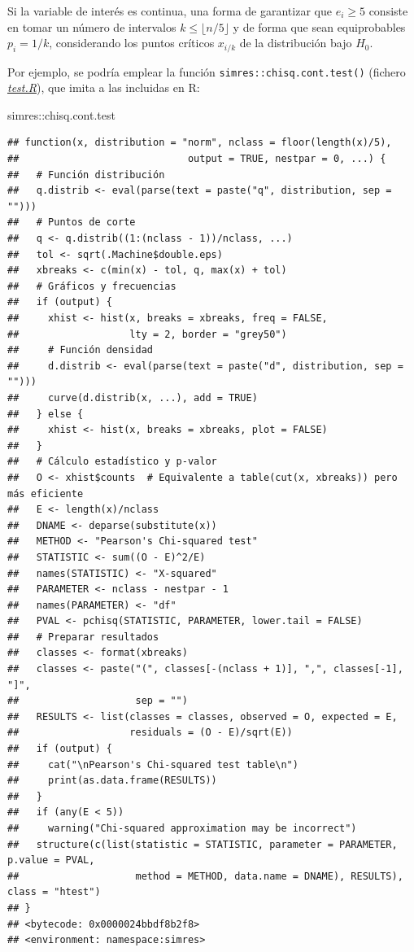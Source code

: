 \documentclass[
]{book}
\newenvironment{Shaded}{\begin{snugshade}}{\end{snugshade}}
\newcommand{\NormalTok}[1]{#1}
\newcommand{\SpecialCharTok}[1]{\textcolor[rgb]{0.00,0.00,0.00}{#1}}
\theoremstyle{break}
\theoremstyle{nonumberplain}
\begin{document}
Si la variable de interés es continua, una forma de garantizar que \(e_{i}\geq5\) consiste en tomar un número de intervalos \(k\leq \lfloor n/5 \rfloor\) y de forma que sean equiprobables \(p_{i}=1/k\),
considerando los puntos críticos \(x_{i/k}\) de la distribución bajo \(H_0\).

Por ejemplo, se podría emplear la función \texttt{simres::chisq.cont.test()} (fichero \href{R/test.R}{\emph{test.R}}), que imita a las incluidas en R:

\begin{Shaded}
\begin{Highlighting}[]
\NormalTok{simres}\SpecialCharTok{::}\NormalTok{chisq.cont.test}
\end{Highlighting}
\end{Shaded}

\begin{verbatim}
## function(x, distribution = "norm", nclass = floor(length(x)/5),
##                             output = TRUE, nestpar = 0, ...) {
##   # Función distribución
##   q.distrib <- eval(parse(text = paste("q", distribution, sep = "")))
##   # Puntos de corte
##   q <- q.distrib((1:(nclass - 1))/nclass, ...)
##   tol <- sqrt(.Machine$double.eps)
##   xbreaks <- c(min(x) - tol, q, max(x) + tol)
##   # Gráficos y frecuencias
##   if (output) {
##     xhist <- hist(x, breaks = xbreaks, freq = FALSE,
##                   lty = 2, border = "grey50")
##     # Función densidad
##     d.distrib <- eval(parse(text = paste("d", distribution, sep = "")))
##     curve(d.distrib(x, ...), add = TRUE)
##   } else {
##     xhist <- hist(x, breaks = xbreaks, plot = FALSE)
##   }
##   # Cálculo estadístico y p-valor
##   O <- xhist$counts  # Equivalente a table(cut(x, xbreaks)) pero más eficiente
##   E <- length(x)/nclass
##   DNAME <- deparse(substitute(x))
##   METHOD <- "Pearson's Chi-squared test"
##   STATISTIC <- sum((O - E)^2/E)
##   names(STATISTIC) <- "X-squared"
##   PARAMETER <- nclass - nestpar - 1
##   names(PARAMETER) <- "df"
##   PVAL <- pchisq(STATISTIC, PARAMETER, lower.tail = FALSE)
##   # Preparar resultados
##   classes <- format(xbreaks)
##   classes <- paste("(", classes[-(nclass + 1)], ",", classes[-1], "]",
##                    sep = "")
##   RESULTS <- list(classes = classes, observed = O, expected = E,
##                   residuals = (O - E)/sqrt(E))
##   if (output) {
##     cat("\nPearson's Chi-squared test table\n")
##     print(as.data.frame(RESULTS))
##   }
##   if (any(E < 5))
##     warning("Chi-squared approximation may be incorrect")
##   structure(c(list(statistic = STATISTIC, parameter = PARAMETER, p.value = PVAL,
##                    method = METHOD, data.name = DNAME), RESULTS), class = "htest")
## }
## <bytecode: 0x0000024bbdf8b2f8>
## <environment: namespace:simres>
\end{verbatim}
\end{document}
